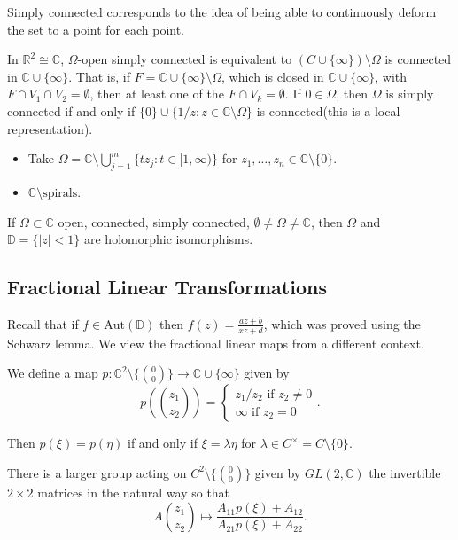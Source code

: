 \documentclass[12pt]{scrartcl}
\newcommand{\R}{\mathbb{R}}
\newcommand{\C}{\mathbb C}
\begin{document}
 Simply connected corresponds to the idea of being able to continuously deform the set to a point for each point.
 
In $\R^2 \cong \C$, $\Omega$-open simply connected is equivalent to $(C \cup \{\infty\}) \setminus \Omega$ is connected in $\C \cup \{\infty\}$.  That is, if $F = \C\cup\{\infty\} \setminus \Omega$, which is closed in $\C \cup \{\infty\}$, with $F \cap V_1 \cap V_2 = \emptyset$, then at least one of the $F \cap V_k = \emptyset$.  If $0 \in \Omega$, then $\Omega$ is simply connected if and only if $\{0\} \cup \{1/z : z \in \C \setminus \Omega\}$ is connected(this is a local representation).

\begin{itemize}
\item Take $\Omega = \C \setminus \bigcup_{j=1}^m \{tz_j : t \in [1, \infty)\}$ for $z_1, \dots, z_n \in \C \setminus \{0\}$.  
\item $\C \setminus\text{spirals}$.
\end{itemize}

\begin{thm} If $\Omega \subset \C$ open, connected, simply connected, $\emptyset \ne \Omega \ne \C$, then $\Omega$ and $\mathbb{D} = \{|z| < 1\}$ are holomorphic isomorphisms.  
\end{thm}

\subsection{Fractional Linear Transformations}
Recall that if $f \in \text{Aut}(\mathbb D)$ then $f(z) = \frac{az+b}{xz + d}$, which was proved using the Schwarz lemma.  We view the fractional linear maps from a different context.  

We define a map $p: \C^2 \setminus\{\binom{0}{0}\} \to \C \cup \{\infty\}$ given by 
$$p\left (\binom{z_1}{z_2}\right ) = \begin{cases}
z_1/z_2 \text{ if }z_2 \ne 0\\
\infty \text{ if } z_2 = 0
\end{cases}.$$

Then $p(\xi) = p(\eta)$ if and only if $\xi = \lambda \eta$ for $\lambda \in C^\times = C \setminus \{0\}$.  

There is a larger group acting on $C^2 \setminus \{\binom{0}{0}\}$ given by $GL(2, \C)$ the invertible $2 \times 2$ matrices in the natural way so that $$A\binom{z_1}{z_2} \mapsto \frac{A_{11} p(\xi) + A_{12}}{A_{21}p(\xi) + A_{22}}.$$
\end{document}
